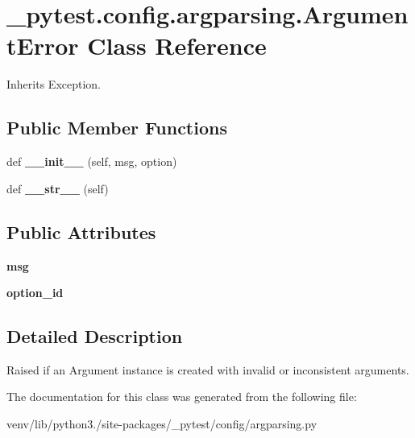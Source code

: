 \hypertarget{class__pytest_1_1config_1_1argparsing_1_1_argument_error}{}\section{\+\_\+pytest.\+config.\+argparsing.\+Argument\+Error Class Reference}
\label{class__pytest_1_1config_1_1argparsing_1_1_argument_error}


Inherits Exception.

\subsection*{Public Member Functions}
\begin{DoxyCompactItemize}
\item 
\mbox{\label{class__pytest_1_1config_1_1argparsing_1_1_argument_error_a08adb1ecd2500b0906c5a44b111bccf6}} 
def {\bfseries \+\_\+\+\_\+init\+\_\+\+\_\+} (self, msg, option)
\item 
\mbox{\label{class__pytest_1_1config_1_1argparsing_1_1_argument_error_a1cca7441fa0f6175c3d12015737eeff0}} 
def {\bfseries \+\_\+\+\_\+str\+\_\+\+\_\+} (self)
\end{DoxyCompactItemize}
\subsection*{Public Attributes}
\begin{DoxyCompactItemize}
\item 
\mbox{\label{class__pytest_1_1config_1_1argparsing_1_1_argument_error_add13b27a54e8aae02ed5daaa87d94f2f}} 
{\bfseries msg}
\item 
\mbox{\label{class__pytest_1_1config_1_1argparsing_1_1_argument_error_a316a2f811158229e88a4d462c0495a55}} 
{\bfseries option\+\_\+id}
\end{DoxyCompactItemize}


\subsection{Detailed Description}
\begin{DoxyVerb}Raised if an Argument instance is created with invalid or
inconsistent arguments.
\end{DoxyVerb}
 

The documentation for this class was generated from the following file\+:\begin{DoxyCompactItemize}
\item 
venv/lib/python3./site-\/packages/\+\_\+pytest/config/argparsing.\+py\end{DoxyCompactItemize}
